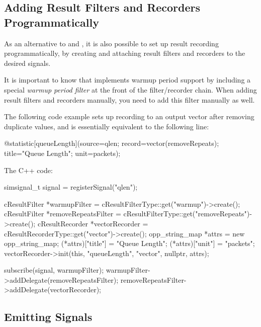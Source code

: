 \subsection{Adding Result Filters and Recorders Programmatically}
\label{sec:simple-modules:statistic-recording-programmatically}

As an alternative to  and ,
it is also possible to set up result recording programmatically, by creating and
attaching result filters and recorders to the desired signals.

\begin{note}
It is important to know that  implements warmup period
support by including a special \textit{warmup period filter} at the
front of the filter/recorder chain. When adding result filters and recorders
manually, you need to add this filter manually as well.
\end{note}

The following code example sets up recording to an output vector after
removing duplicate values, and is essentially equivalent to the following
 line:

\begin{ned}
@statistic[queueLength](source=qlen; record=vector(removeRepeats);
                        title="Queue Length"; unit=packets);
\end{ned}

The C++ code:

\begin{cpp}
simsignal_t signal = registerSignal("qlen");

cResultFilter *warmupFilter =
        cResultFilterType::get("warmup")->create();
cResultFilter *removeRepeatsFilter =
        cResultFilterType::get("removeRepeats")->create();
cResultRecorder *vectorRecorder =
        cResultRecorderType::get("vector")->create();
opp_string_map *attrs = new opp_string_map;
(*attrs)["title"] = "Queue Length";
(*attrs)["unit"] = "packets";
vectorRecorder->init(this, "queueLength", "vector", nullptr, attrs);

subscribe(signal, warmupFilter);
warmupFilter->addDelegate(removeRepeatsFilter);
removeRepeatsFilter->addDelegate(vectorRecorder);
\end{cpp}


\subsection{Emitting Signals}
\label{sec:simple-modules:emitting-statistic-signals}

